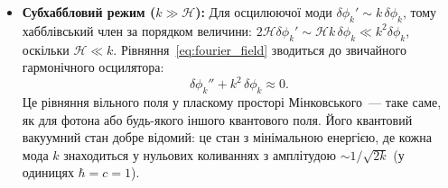 \begin{itemize}
  \item \textbf{Субхаббловий режим ($k \gg \mathcal{H}$):}
        Для осцилюючої моди $\delta\phi_k' \sim k\,\delta\phi_k$,
        тому хабблівський член за порядком величини:
        $2\mathcal{H}\delta\phi_k' \sim \mathcal{H}k\,\delta\phi_k
        \ll k^2\delta\phi_k$,
        оскільки $\mathcal{H} \ll k$.
        Рівняння~\eqref{eq:fourier_field} зводиться до звичайного
        гармонічного осцилятора:
        \begin{equation*}
          \delta\phi_k'' + k^2\,\delta\phi_k \approx 0.
        \end{equation*}
        Це рівняння вільного поля у пласкому просторі Мінковського~---
        таке саме, як для фотона або будь-якого іншого квантового поля.
        Його квантовий вакуумний стан добре відомий: це стан з мінімальною
        енергією, де кожна мода $k$ знаходиться у нульових коливаннях з
        амплітудою $\sim 1/\sqrt{2k}$ (у одиницях $\hbar = c = 1$).


\end{itemize}
